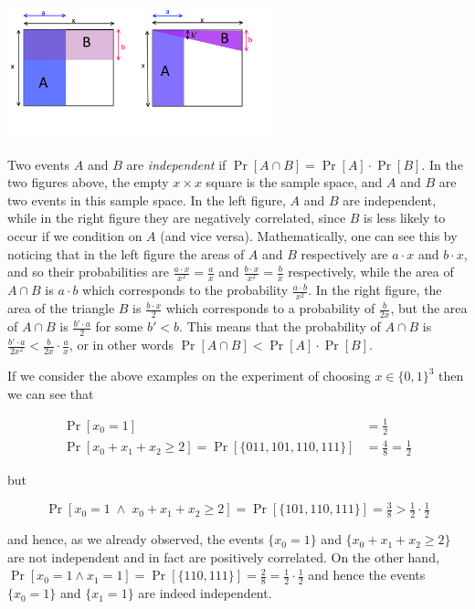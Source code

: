 \begin{marginfigure}
\centering
\includegraphics[width=\linewidth, height=1.5in, keepaspectratio]{../figure/independence.png}
\caption{Two events \(A\) and \(B\) are \emph{independent} if
\(\Pr[A \cap B]=\Pr[A]\cdot \Pr[B]\). In the two figures above, the
empty \(x\times x\) square is the sample space, and \(A\) and \(B\) are
two events in this sample space. In the left figure, \(A\) and \(B\) are
independent, while in the right figure they are negatively correlated,
since \(B\) is less likely to occur if we condition on \(A\) (and vice
versa). Mathematically, one can see this by noticing that in the left
figure the areas of \(A\) and \(B\) respectively are \(a\cdot x\) and
\(b\cdot x\), and so their probabilities are
\(\tfrac{a\cdot x}{x^2}=\tfrac{a}{x}\) and
\(\tfrac{b\cdot x}{x^2}=\tfrac{b}{x}\) respectively, while the area of
\(A \cap B\) is \(a\cdot b\) which corresponds to the probability
\(\tfrac{a\cdot b}{x^2}\). In the right figure, the area of the triangle
\(B\) is \(\tfrac{b\cdot x}{2}\) which corresponds to a probability of
\(\tfrac{b}{2x}\), but the area of \(A \cap B\) is
\(\tfrac{b' \cdot a}{2}\) for some \(b'<b\). This means that the
probability of \(A \cap B\) is
\(\tfrac{b'\cdot a}{2x^2} < \tfrac{b}{2x} \cdot \tfrac{a}{x}\), or in
other words \(\Pr[A \cap B ] < \Pr[A] \cdot \Pr[B]\).}
\label{independencefig}
\end{marginfigure}

If we consider the above examples on the experiment of choosing
\(x\in \{0,1\}^3\) then we can see that

\[
\begin{aligned}
\Pr[x_0=1] &= \tfrac{1}{2} \\
\Pr[x_0+x_1+x_2 \geq 2] = \Pr[\{ 011,101,110,111 \}] &= \tfrac{4}{8} = \tfrac{1}{2}
\end{aligned}
\]

but

\[
\Pr[x_0 =1 \; \wedge \; x_0+x_1+x_2 \geq 2 ] = \Pr[ \{101,110,111 \} ] = \tfrac{3}{8} > \tfrac{1}{2} \cdot \tfrac{1}{2}
\]

and hence, as we already observed, the events \(\{ x_0 = 1 \}\) and
\(\{ x_0+x_1+x_2 \geq 2 \}\) are not independent and in fact are
positively correlated. On the other hand,
\(\Pr[ x_0 = 1 \wedge x_1 = 1 ] = \Pr[ \{110,111 \}] = \tfrac{2}{8} = \tfrac{1}{2} \cdot \tfrac{1}{2}\)
and hence the events \(\{x_0 = 1 \}\) and \(\{ x_1 = 1 \}\) are indeed
independent.


